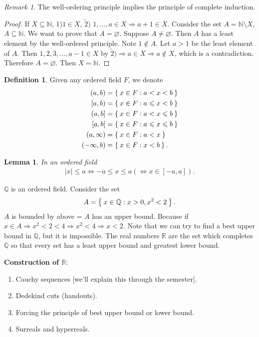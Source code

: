 \documentclass[12pt]{amsbook}
\let\emptyset\varnothing
\theoremstyle{plain}
\numberwithin{section}{chapter}
\numberwithin{equation}{chapter}
\newtheorem{lem}[theorem]{Lemma}
\theoremstyle{definition}
\newtheorem{Def}[theorem]{Definition}
\theoremstyle{remark}
\newtheorem{rem}[theorem]{Remark}
\theoremstyle{plain}
\newcommand{\sub}{\subseteq}
\newcommand{\R}{\mathbb{R}}
\newcommand{\n}{\mathbb{N}}
\newcommand{\Q}{\mathbb{Q}}
\newcommand{\bee}{\begin{equation}\begin{aligned}}
\newcommand{\eee}{\end{aligned}\end{equation}}
\newcommand{\tilda}{\tilde}
\renewcommand{\leq}{\leqslant}
\begin{document}
\begin{rem}
The well-ordering principle implies the principle of complete induction. 
\end{rem}
\begin{proof}
If $X \sub \n$, 1)$1 \in X$, $\tilda{2})$ $1,...,a \in X \Rightarrow a + 1 \in X$. Consider the set $A = \n \setminus X$, $A \sub \n$. We want to prove that $A = \emptyset$. Suppose $A \neq \emptyset$. Then $A$ has a least element by the well-ordered principle. Note $1 \notin A$. Let $a > 1$ be the least element of $A$. Then $1,2,3,...,a - 1 \in X$ by $\tilda{2}) \Rightarrow a \in X \Rightarrow a \notin X$, which is a contradiction. Therefore $A = \emptyset$. Then $X = \n$. 
\end{proof}

\begin{Def}
Given any ordered field $F$, we denote
\bee
(a,b) &= \Set{x \in F: a < x < b}\\
[a,b) &= \Set{x \in F: a \leq x < b}\\
(a,b] &= \Set{x \in F: a < x \leq b}\\
[a,b] &= \Set{x \in F: a \leq x \leq b}\\
(a,\infty) &= \Set{x \in F: a < x}\\
(-\infty,b) &= \Set{x \in F:x < b}.
\eee
\end{Def}
\begin{lem}
In an ordered field
\bee
|x| \leq a \Leftrightarrow -a \leq x \leq a (\Leftrightarrow x \in [-a,a]).
\eee
\end{lem}

$\Q$ is an ordered field. Consider the set 
\bee
A = \Set{x \in \Q:x > 0,x^2 < 2}. 
\eee
$A$ is bounded by above = $A$ has an upper bound. Because if $x \in A \Rightarrow x^2 < 2 < 4 \Rightarrow x^2 < 4 \Rightarrow x < 2$. Note that we can try to find a best upper bound in $\Q$, but it is impossible. The real numbers $\R$ are the set which completes $\Q$ so that every set has a least upper bound and greatest lower bound. 


\textbf{Construction of $\R$}: 
\begin{enumerate}
\item Cauchy sequences [we'll explain this through the semester].
\item Dedekind cuts (handouts). 
\item Forcing the principle of best upper bound or lower bound. 
\item Surreals and hyperreals. 
\end{enumerate}
\end{document}
